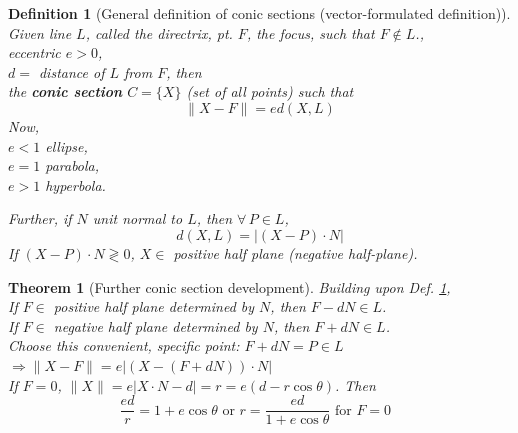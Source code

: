 \documentclass[10pt]{amsart}
\newtheorem{theorem}{Theorem}
\newtheorem{definition}{Definition}
\begin{document}
\begin{multicols*}{2}
\begin{definition}[General definition of conic sections (vector-formulated definition)]\label{Def:ConicSectionsVectorFormulation}
Given line $L$, called the \emph{directrix}, pt. $F$, the \emph{focus}, such that $F \notin L$., \\
\phantom{Given} eccentric $e > 0$, \\
\phantom{Given} $d = $ distance of $L$ from $F$, then \\
the \textbf{conic section} $C = \lbrace X \rbrace$ (set of all points) such that 
\begin{equation}\label{Eq:ConicSectionVectorGeneralDefinition}
\| X - F \| = ed(X, L)
\end{equation}
Now, \\
$e < 1 $ ellipse, \\
$e = 1$ parabola, \\
$e > 1$ hyperbola.

Further, if $N$ unit normal to $L$, then $\forall \, P \in L$, 
\begin{equation}
d(X, L) = | (X- P) \cdot N |
\end{equation}
If $(X- P) \cdot N \gtrless 0$, $X \in $ positive half plane (negative half-plane). \\
\end{definition} 

\begin{theorem}[Further conic section development]\label{Thm:MoreConicSectionsFromVectorFormulation}
	Building upon Def. \ref{Def:ConicSectionsVectorFormulation}, \\
	
	If $F \in $ positive half plane determined by $N$, then $F -d N \in L$.  \\
	
	If $F \in $ negative half plane determined by $N$, then $F + dN \in L$. \\
	
Choose this convenient, specific point: $ F + dN = P \in L$ \quad \, $\Longrightarrow \| X - F \| = e |(X - (F + dN))\cdot N |$ \\

If $F = 0$, $\| X \| = e| X\cdot N - d | = r = e(d - r\cos{\theta})$. Then
\begin{equation}\label{Eq:ConicSectionEqWithCenterAtFocus}
\frac{ed}{r} = 1 + e \cos{\theta} \text{ or } \boxed{ r = \frac{ed }{ 1 + e\cos{\theta}} } \text{ for $F = 0$ }
\end{equation}	


\end{theorem}
\end{multicols*}
\end{document}
